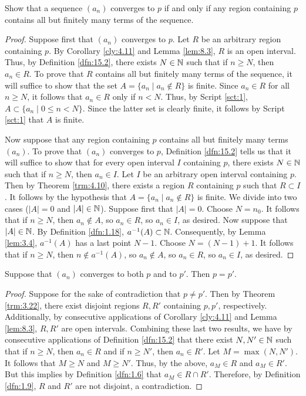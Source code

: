 \documentclass[../main.tex]{subfiles}
\begin{document}
\begin{exercise}\label{exr:15.3}
    Show that a sequence $(a_n)$ converges to $p$ if and only if any region containing $p$ contains all but finitely many terms of the sequence.
    \begin{proof}
        Suppose first that $(a_n)$ converges to $p$. Let $R$ be an arbitrary region containing $p$. By Corollary \ref{cly:4.11} and Lemma \ref{lem:8.3}, $R$ is an open interval. Thus, by Definition \ref{dfn:15.2}, there exists $N\in\mathbb{N}$ such that if $n\geq N$, then $a_n\in R$. To prove that $R$ contains all but finitely many terms of the sequence, it will suffice to show that the set $A=\{a_n\mid a_n\notin R\}$ is finite. Since $a_n\in R$ for all $n\geq N$, it follows that $a_n\in R$ only if $n<N$. Thus, by Script \ref{sct:1}, $A\subset\{a_n\mid 0\leq n<N\}$. Since the latter set is clearly finite, it follows by Script \ref{sct:1} that $A$ is finite.\par
        Now suppose that any region containing $p$ contains all but finitely many terms $(a_n)$. To prove that $(a_n)$ converges to $p$, Definition \ref{dfn:15.2} tells us that it will suffice to show that for every open interval $I$ containing $p$, there exists $N\in\mathbb{N}$ such that if $n\geq N$, then $a_n\in I$. Let $I$ be an arbitrary open interval containing $p$. Then by Theorem \ref{trm:4.10}, there exists a region $R$ containing $p$ such that $R\subset I$. It follows by the hypothesis that $A=\{a_n\mid a_n\notin R\}$ is finite. We divide into two cases ($|A|=0$ and $|A|\in\mathbb{N}$). Suppose first that $|A|=0$. Choose $N=n_0$. It follows that if $n\geq N$, then $a_n\notin A$, so $a_n\in R$, so $a_n\in I$, as desired. Now suppose that $|A|\in\mathbb{N}$. By Definition \ref{dfn:1.18}, $a^{-1}(A)\subset\mathbb{N}$. Consequently, by Lemma \ref{lem:3.4}, $a^{-1}(A)$ has a last point $N-1$. Choose $N=(N-1)+1$. It follows that if $n\geq N$, then $n\notin a^{-1}(A)$, so $a_n\notin A$, so $a_n\in R$, so $a_n\in I$, as desired.
    \end{proof}
\end{exercise}

\begin{theorem}\label{trm:15.4}
    Suppose that $(a_n)$ converges to both $p$ and to $p'$. Then $p=p'$.
    \begin{proof}
        Suppose for the sake of contradiction that $p\neq p'$. Then by Theorem \ref{trm:3.22}, there exist disjoint regions $R,R'$ containing $p,p'$, respectively. Additionally, by consecutive applications of Corollary \ref{cly:4.11} and Lemma \ref{lem:8.3}, $R,R'$ are open intervals. Combining these last two results, we have by consecutive applications of Definition \ref{dfn:15.2} that there exist $N,N'\in\mathbb{N}$ such that if $n\geq N$, then $a_n\in R$ and if $n\geq N'$, then $a_n\in R'$. Let $M=\max(N,N')$. It follows that $M\geq N$ and $M\geq N'$. Thus, by the above, $a_M\in R$ and $a_M\in R'$. But this implies by Definition \ref{dfn:1.6} that $a_M\in R\cap R'$. Therefore, by Definition \ref{dfn:1.9}, $R$ and $R'$ are not disjoint, a contradiction.
    \end{proof}
\end{theorem}
\end{document}
